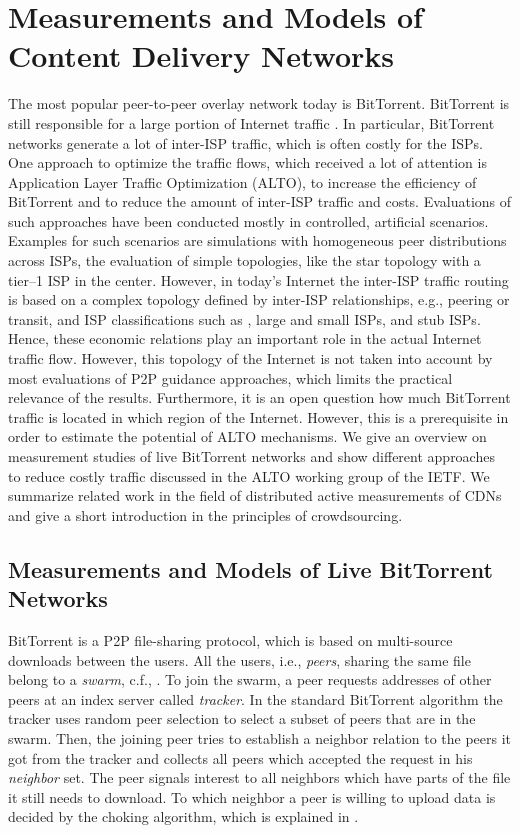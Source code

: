 \section{Measurements and Models of Content Delivery Networks}

The most popular peer-to-peer overlay network today is BitTorrent.
BitTorrent is still responsible for a large portion of Internet traffic \cite{cisco2016,wamser2010}. In particular, BitTorrent networks generate a lot of inter-ISP traffic, which is often costly for the ISPs. One approach to optimize the traffic flows, which received a lot of attention is Application Layer Traffic Optimization (ALTO), to increase the efficiency of BitTorrent and to reduce the amount of inter-ISP traffic and costs. Evaluations of such approaches have been conducted mostly in controlled, artificial scenarios. Examples for such scenarios are simulations with homogeneous peer distributions across ISPs, the evaluation of simple topologies, like the star topology with a tier--1 ISP in the center. However, in today's Internet the inter-ISP traffic routing is based on a complex topology defined by inter-ISP relationships, e.g., peering or transit, and ISP classifications such as \tier, large and small ISPs, and stub ISPs. Hence, these economic relations play an important role in the actual Internet traffic flow. However, this topology of the Internet is not taken into account by most evaluations of P2P guidance approaches, which limits the practical relevance of the results. Furthermore, it is an open question how much BitTorrent traffic is located in which region of the Internet. However, this is a prerequisite in order to estimate the potential of ALTO mechanisms.
We give an overview on measurement studies of live BitTorrent networks and show different approaches to reduce costly traffic discussed in the ALTO working group of the IETF.
We summarize related work in the field of distributed active measurements of CDNs and give a short introduction in the principles of crowdsourcing.

\subsection{Measurements and Models of Live BitTorrent Networks}

BitTorrent is a P2P file-sharing protocol, which is based on multi-source downloads between the users. All the users, i.e., \textit{peers}, sharing the same file belong to a \textit{swarm}, c.f., . To join the swarm, a peer requests addresses of other peers at an index server called \textit{tracker}. In the standard BitTorrent algorithm the tracker uses random peer selection to select a subset of peers that are in the swarm. Then, the joining peer tries to establish a neighbor relation to the peers it got from the tracker and collects all peers which accepted the request in his \textit{neighbor} set. The peer signals interest to all neighbors which have parts of the file it still needs to download. To which neighbor a peer is willing to upload data is decided by the choking algorithm, which is explained in \cite{cohen:bt}.

